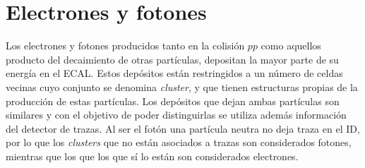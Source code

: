 

\section{Electrones y fotones}


Los electrones y fotones producidos tanto en la colisión $pp$ como aquellos producto del decaimiento de otras partículas, depositan la mayor parte de su energía en el ECAL. Estos depósitos están restringidos a un número de celdas vecinas cuyo conjunto se denomina \textit{cluster}, y que tienen estructuras propias de la producción de estas partículas. Los depósitos que dejan ambas partículas son similares y con el objetivo de poder distinguirlas se utiliza además información del detector de trazas. Al ser el fotón una partícula neutra no deja traza en el ID, por lo que los \textit{clusters} que no están asociados a trazas son considerados fotones, mientras que los que los que sí lo están son considerados electrones. 

